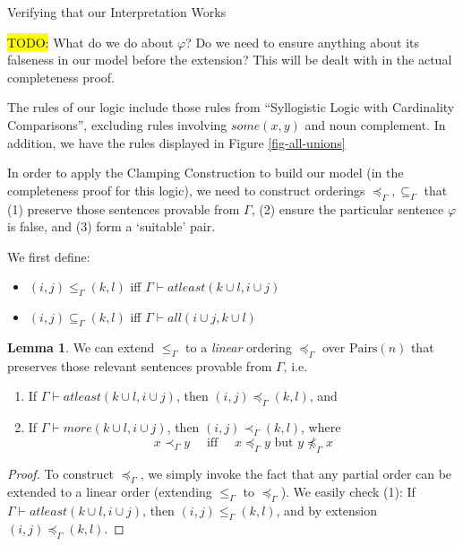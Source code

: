 \documentclass[12pt]{article}
\theoremstyle{definition}
\newtheorem{lemma}[theorem]{Lemma}
\newcommand{\quadiff}{\quad \mbox{ iff } \quad}
\newcommand{\Pairs}{\mbox{Pairs}}
\newcommand{\provsub}{\subseteq_{\Gamma}}
\newcommand{\provle}{\le_{\Gamma}}
\newcommand{\provextended}{\preceq_{\Gamma}}
\newcommand{\provextendedstrict}{\prec_{\Gamma}}
\newcommand{\nprovextended}{\npreceq_{\Gamma}}
\begin{document}
\begin{section}{Verifying that our Interpretation Works}

\hl{TODO:} What do we do about $\varphi$?  Do we need to ensure anything about its falseness in our model before the extension?  This will be dealt with in the actual completeness proof.

The rules of our logic include those rules from ``Syllogistic Logic with Cardinality Comparisons'', excluding rules involving $some(x, y)$ and noun complement.  In addition, we have the rules displayed in Figure \ref{fig-all-unions}

In order to apply the Clamping Construction to build our model (in the completeness proof for this logic), we need to construct orderings $\provextended, \provsub$ that (1) preserve those sentences provable from $\Gamma$, (2) ensure the particular sentence $\varphi$ is false, and (3) form a `suitable' pair.

We first define:

\begin{itemize}
    \item $(i, j) \provle (k, l)$ iff $\Gamma \vdash atleast(k \cup l, i \cup j)$
    
    \item $(i, j) \provsub (k, l)$ iff $\Gamma \vdash all(i \cup j, k \cup l)$
\end{itemize}

\begin{lemma}
    We can extend $\provle$ to a \textit{linear} ordering $\provextended$ over $\Pairs(n)$ that preserves those relevant sentences provable from $\Gamma$, i.e.
    
    \begin{enumerate}
        \item If $\Gamma \vdash atleast(k \cup l, i \cup j)$, then $(i,j) \provextended (k,l)$, and
        
        \item If $\Gamma \vdash more(k \cup l, i \cup j)$, then $(i,j) \provextendedstrict (k,l)$, where
        \[ x \provextendedstrict y \quadiff x \provextended y \mbox{ but } y \nprovextended x\]
    \end{enumerate}
\end{lemma}

\begin{proof}
To construct $\provextended$, we simply invoke the fact that any partial order can be extended to a linear order (extending $\provle$ to $\provextended$).
We easily check (1): If $\Gamma \vdash atleast(k \cup l, i \cup j)$, then $(i,j) \provle (k,l)$, and by extension $(i,j) \provextended (k,l)$.


\end{proof}
\end{section}
\end{document}

